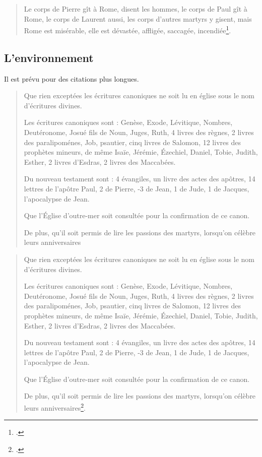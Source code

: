     \begin{quote}
    Le corps de Pierre gît à Rome, disent les hommes, le corps de Paul gît à Rome, le corps de Laurent aussi, les corps d'autres martyrs y gisent, mais Rome est misérable, elle est dévastée, affligée, saccagée, incendiée\footcite[6]{AugustinSermo296}.
    \end{quote}

\subsection{L'environnement }

Il est prévu pour des citations plus longues.

\begin{latexcode}
\begin{quotation}
Que rien exceptées les écritures canoniques ne soit lu en église sous le nom d’écritures divines.

Les écritures canoniques sont : Genèse, Exode, Lévitique, Nombres, Deutéronome,
Josué fils de Noun, Juges, Ruth, 4 livres des règnes, 2 livres des paralipoménes,
Job, psautier, cinq livres de Salomon, 12 livres des prophètes mineurs,
de même Isaïe, Jérémie, Ézechiel, Daniel,
Tobie, Judith, Esther,
2 livres d’Esdras, 2 livres des Maccabées.

Du nouveau testament sont :
4 évangiles, un livre des actes des apôtres,
14 lettres de l’apôtre Paul, 2 de Pierre,
-3 de Jean, 1 de Jude, 1 de Jacques,
l’apocalypse de Jean.

Que l’Église d'outre-mer soit consultée pour la confirmation de ce canon.

De plus, qu'il soit permis de lire les passions des martyrs,
lorsqu'on célèbre leurs anniversaires
\end{quotation}
\end{latexcode}

    \begin{quotation}
Que rien exceptées les écritures canoniques ne soit lu en église sous le nom d’écritures divines.

Les écritures canoniques sont : Genèse, Exode, Lévitique, Nombres, Deutéronome,
Josué fils de Noun, Juges, Ruth, 4 livres des règnes, 2 livres des paralipoménes,
Job, psautier, cinq livres de Salomon, 12 livres des prophètes mineurs,
de même Isaïe, Jérémie, Ézechiel, Daniel,
Tobie, Judith, Esther,
2 livres d’Esdras, 2 livres des Maccabées.

Du nouveau testament sont :
4 évangiles, un livre des actes des apôtres,
14 lettres de l’apôtre Paul, 2 de Pierre,
-3 de Jean, 1 de Jude, 1 de Jacques,
l’apocalypse de Jean.

Que l’Église d'outre-mer soit consultée pour la confirmation de ce canon.

De plus, qu'il soit permis de lire les passions des martyrs,
lorsqu'on célèbre leurs anniversaires\footcite{BreveHippone}.

    \end{quotation}

